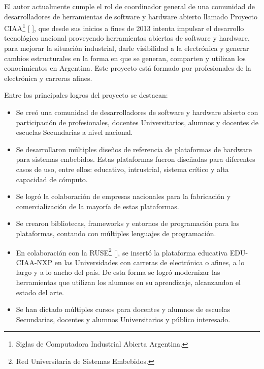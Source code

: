 El autor actualmente cumple el rol de coordinador general de una comunidad de desarrolladores de herramientas de software y hardware abierto llamado Proyecto CIAA\footnote{Siglas de Computadora Industrial Abierta Argentina.} [ ], que desde sus inicios a fines de 2013 intenta impulsar el desarrollo tecnológico nacional proveyendo herramientas abiertas de software y hardware, para mejorar la situación industrial, darle visibilidad a la electrónica y generar cambios estructurales en la forma en que se generan, comparten y utilizan los conocimientos en Argentina. Este proyecto está formado por profesionales de la electrónica y carreras afines.

Entre los principales logros del proyecto se destacan:

\begin{itemize}
\item
Se creó una comunidad de desarrolladores de software y hardware abierto con participación de profesionales, docentes Universitarios, alumnos y docentes de escuelas Secundarias a nivel nacional.
\item
Se desarrollaron múltiples diseños de referencia de plataformas de hardware para sistemas embebidos. Estas plataformas fueron diseñadas para diferentes casos de uso, entre ellos: educativo, intrustrial, sistema crítico y alta capacidad de cómputo.
\item
Se logró la colaboración de empresas nacionales para la fabricación y comercialización de la mayoría de estas plataformas.
\item
Se crearon bibliotecas, frameworks y entornos de programación para las plataformas, contando con múltiples lenguajes de programación.
\item
En colaboración con la RUSE\footnote{Red Universitaria de Sistemas Embebidos.} [], se insertó la plataforma educativa EDU-CIAA-NXP en las Universidades con carreras de electrónica o afines, a lo largo y a lo ancho del país. De esta forma se logró modernizar las herramientas que utilizan los alumnos en su aprendizaje, alcanzandon el estado del arte.
\item
Se han dictado múltiples cursos para docentes y alumnos de escuelas Secundarias, docentes y alumnos Universitarios y público interesado.
\end{itemize}